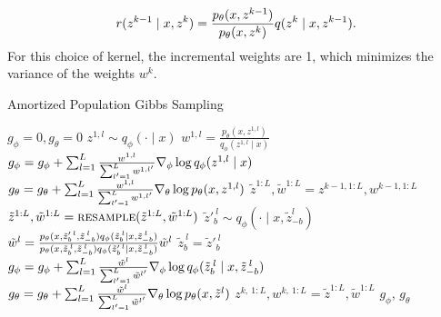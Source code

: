 \documentclass{article}
\theoremstyle{definition}
\begin{document}
\begin{align*}
    r(z^{k-1} \mid x, z^k)
    =   
    \frac{p_\theta(x, z^{k-1})}
         {p_\theta(x, z^k)}
    q(z^{k} \mid x, z^{k-1})
    .
\end{align*}
For this choice of kernel, the incremental weights are 1, which minimizes the variance of the weights $w^k$.
\begin{algorithm}[!tb]
  \caption{Amortized Population Gibbs Sampling}
  \label{alg:amortized-gibbs}
\begin{algorithmic}[1]
\small
  \State $g_\phi = 0, g_\theta = 0$\label{line:init-grad}
  \label{line:rws-loop}
      \State $z^{1,l} \sim q_\phi(\cdot \mid x)$\label{line:rws-propose}
      \State $w^{1,l} = \frac{p_\theta(x, z^{1,l})}{q_\phi(z^{1,l} \mid x)}$\label{line:rws-weight}
  \EndFor
  \State $g_\phi = g_\phi + \sum_{l = 1}^L \frac{w^{1,l}}{\sum_{l' = 1}^L w^{1,l'}} \nabla_\phi \log q_\phi(z^{1,l} \mid x)$\label{line:rws-grad-phi}
  \State $g_\theta = g_\theta + \sum_{l = 1}^L \frac{w^{1,l}}{\sum_{l' = 1}^L w^{1,l'}} \nabla_\theta \log p_\theta(x, z^{1,l})$\label{line:rws-grad-theta}
  \label{line:sweep-loop}
    \State $\tilde{z}^{1:L}, \tilde{w}^{1:L} = z^{k-1,1:L}, w^{k-1,1:L}$ \label{line:apg-sweep-begin}
    \label{line:block-loop}
      \State $\tilde{z}^{1:L}, \tilde{w}^{1:L}=\textsc{resample}(\tilde{z}^{1:L}, \tilde{w}^{1:L})$\label{line:resample} 
        \label{line:apg-sample-loop}
          \State $\tilde{z}'^{\:l}_b \sim q_\phi(\cdot \mid x, \tilde{z}_{-b}^l)$\label{line:apg-propose}
          \State \label{line:apg-weight} $\tilde{w}^l = \frac{p_\theta(x, \tilde{z}'^{\:l}_{b}, \tilde{z}^{\:l}_{-b}) q_\phi(\tilde{z}^{\:l}_b \mid x, \tilde{z}^{\:l}_{-b})}{p_\theta(x, \tilde{z}^{\:l}_b, \tilde{z}^{\:l}_{-b}) q_\phi(\tilde{z}'^{\:l}_b \mid x, \tilde{z}^{\:l}_{-b})}\tilde{w}^l$ 
          \State \label{line:apg-reassign}$\tilde{z}^{\:l}_b = \tilde{z}'^{\:l}_b$ 
      \EndFor
      \State $g_\phi=g_\phi+ \sum_{l = 1}^L\frac{\tilde{w}^l}{\sum_{l'= 1}^L \tilde{w}^{l'}} \nabla_\phi\log q_\phi(\tilde{z}^{\:l}_b \mid x, \tilde{z}^{\:l}_{-b})$\label{line:apg-grad-phi}
      \State $g_\theta = g_\theta + \sum_{l = 1}^L \frac{\tilde{w}^l}{\sum_{l' = 1}^L \tilde{w}^{l'}} \nabla_\theta \log p_\theta(x, \tilde{z}^l)$ \label{line:apg-grad-theta}
     \EndFor
     \State $z^{k,\:1:L}, w^{k,\:1:L} = \tilde{z}^{1:L}, \tilde{w}^{1:L}$\label{line:apg-sweep-end}
     \vspace{0.5em}
  \EndFor
  \Return $g_\phi$, $g_\theta$
\end{algorithmic}
\end{algorithm}
\end{document}
